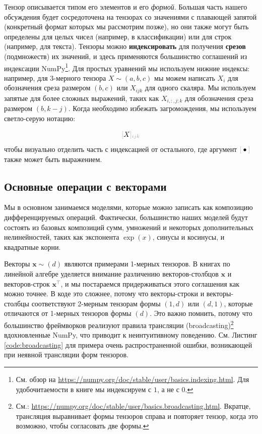 Тензор описывается типом его элементов и его \textit{формой}. Большая часть нашего обсуждения будет сосредоточена на тензорах со значениями с плавающей запятой (конкретный формат которых мы рассмотрим позже), но они также могут быть определены для целых чисел (например, в классификации) или для строк (например, для текста). Тензоры можно \textbf{индексировать} для получения \textbf{срезов} (подмножеств) их значений, и здесь применяются большинство соглашений из индексации NumPy\footnote{См. обзор на \url{https://numpy.org/doc/stable/user/basics.indexing.html}. Для удобочитаемости в книге мы индексируем с $1$, а не с $0$.}. Для простых уравнений мы используем нижние индексы: например, для 3-мерного тензора $X \sim (a, b, c)$ мы можем написать $X_i$ для обозначения среза размером $(b,c)$ или $X_{ijk}$ для одного скаляра. Мы используем запятые для более сложных выражений, таких как $X_{i, :, j:k}$ для обозначения среза размером $(b, k-j)$. Когда необходимо избежать загромождения, мы используем светло-серую нотацию:

\begin{equation*}
    \idx{X}{ijk}
\end{equation*}
%
чтобы визуально отделить часть с индексацией от остального, где аргумент $\idx{\bullet}{}$ также может быть выражением.

\subsection{Основные операции с векторами}
\label{subsec:common_vector_operations}

Мы в основном занимаемся моделями, которые можно записать как композицию дифференцируемых операций. Фактически, большинство наших моделей будут состоять из базовых композиций сумм, умножений и некоторых дополнительных нелинейностей, таких как экспонента $\exp(x)$, синусы и косинусы, и квадратные корни.

Векторы $\mathbf{x} \sim (d)$ являются примерами 1-мерных тензоров. В книгах по линейной алгебре уделяется внимание различению векторов-столбцов $\mathbf{x}$ и векторов-строк $\mathbf{x}^\top$, и мы постараемся придерживаться этого соглашения как можно точнее. В коде это сложнее, потому что векторы-строки и векторы-столбцы соответствуют 2-мерным тензорам формы $(1,d)$ или $(d,1)$, которые отличаются от 1-мерных тензоров формы $(d)$. Это важно помнить, потому что большинство фреймворков реализуют правила трансляции (broadcasting)\footnote{См.: \url{https://numpy.org/doc/stable/user/basics.broadcasting.html}. Вкратце, трансляция выравнивает формы тензоров справа и повторяет тензор, когда это возможно, чтобы согласовать две формы.} вдохновленные NumPy, что приводит к неинтуитивному поведению. См. Листинг \ref{code:broadcasting} для примера очень распространенной ошибки, возникающей при неявной трансляции форм тензоров.

